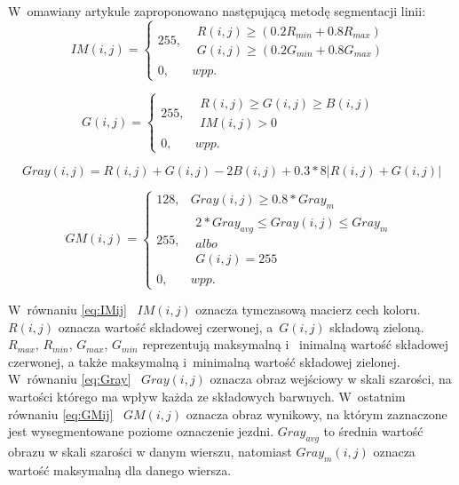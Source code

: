 W~omawiany artykule zaproponowano następującą metodę segmentacji linii:
\begin{equation}
\label{eq:IMij}
IM(i,j)=\left\{\begin{matrix}
255, & \begin{matrix}
R(i,j)\geq (0.2R_{min}+0.8R_{max})\\ 
G(i,j)\geq (0.2G_{min}+0.8G_{max})
\end{matrix}\\ 
0, & wpp.
\end{matrix}\right.
\end{equation}

\begin{equation}
\label{eq:Gij}
G(i,j)=\left\{\begin{matrix}
255, & \begin{matrix}
R(i,j)\geq G(i,j) \geq B(i,j)\\ 
IM(i,j)>0
\end{matrix}\\ 
0, & wpp.
\end{matrix}\right.
\end{equation}

\begin{equation}
\label{eq:Gray}
Gray(i,j)=R(i,j)+G(i,j)-2B(i,j)+0.3*8|R(i,j)+G(i,j)|
\end{equation}

\begin{equation}
\label{eq:GMij}
GM(i,j)=\left\{\begin{matrix}
128, &  Gray(i,j)\geq 0.8*Gray_{m} \\ 
255, & \begin{matrix}
2*Gray_{avg} \leq Gray(i, j) \leq Gray_{m}\\albo\\ 
G(i,j)=255
\end{matrix} \\ 
0,   & wpp.
\end{matrix}\right.
\end{equation}

W~równaniu \eqref{eq:IMij} \ ${IM(i,j)}$ oznacza tymczasową macierz cech koloru. ${R(i,j)}$ oznacza wartość składowej czerwonej, a~${G(i,j)}$ składową zieloną. 
${R_{max}}$, ${R_{min}}$, ${G_{max}}$, ${G_{min}}$ reprezentują maksymalną i ~inimalną wartość składowej czerwonej, a także maksymalną i~minimalną wartość składowej zielonej. 
W~równaniu \eqref{eq:Gray} \ $ Gray(i,j)$ oznacza obraz wejściowy w skali szarości, na wartości którego ma wpływ każda ze składowych barwnych. 
W~ostatnim równaniu \eqref{eq:GMij} \ $GM(i,j)$ oznacza obraz wynikowy, na którym zaznaczone jest wysegmentowane poziome oznaczenie jezdni. 
$Gray_{avg}$ to średnia wartość obrazu w skali szarości w danym wierszu, natomiast $Gray_{m}(i,j)$ oznacza wartość maksymalną dla danego wiersza.

